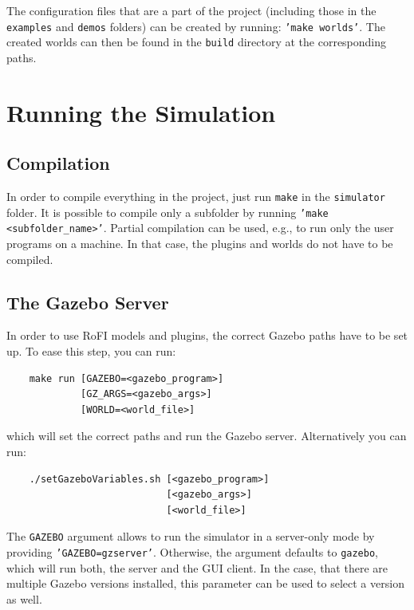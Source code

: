 \documentclass[
  printed, %
  color,   %
  notable, %
  oneside, %
  nolof,   %
  nolot,   %
  nocover,
]{fithesis3}
\newcommand{\code}[1]{\texttt{#1}}
\begin{document}
The configuration files that are a part of the project (including those in the \code{examples} and \code{demos} folders) can be created by running: \code{'make worlds'}.
The created worlds can then be found in the \code{build} directory at the corresponding paths.

\section{Running the Simulation}

\subsection{Compilation}

In order to compile everything in the project, just run \code{make} in the \code{simulator} folder.
It is possible to compile only a subfolder by running \code{'make <subfolder\_name>'}.
Partial compilation can be used, e.g., to run only the user programs on a machine.
In that case, the plugins and worlds do not have to be compiled.

\subsection{The Gazebo Server}

In order to use RoFI models and plugins, the correct Gazebo paths have to be set up.
To ease this step, you can run:
\begin{center}
\begin{verbatim}
    make run [GAZEBO=<gazebo_program>]
             [GZ_ARGS=<gazebo_args>]
             [WORLD=<world_file>]
\end{verbatim}
\end{center}
which will set the correct paths and run the Gazebo server.
Alternatively you can run:
\begin{center}
\begin{verbatim}
    ./setGazeboVariables.sh [<gazebo_program>]
                            [<gazebo_args>]
                            [<world_file>]
\end{verbatim}
\end{center}

The \code{GAZEBO} argument allows to run the simulator in a server-only mode by providing \code{'GAZEBO=gzserver'}.
Otherwise, the argument defaults to \code{gazebo}, which will run both, the server and the GUI client.
In the case, that there are multiple Gazebo versions installed, this parameter can be used to select a version as well.
\end{document}
